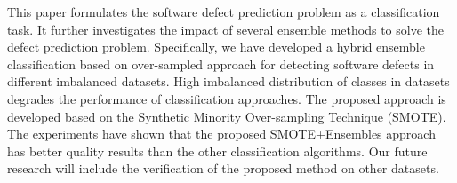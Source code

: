\documentclass[runningheads,a4paper]{llncs}
\begin{document}
This paper formulates the software defect prediction problem as a classification task. It further investigates the impact of several
ensemble methods to solve the defect prediction problem. Specifically, we have developed a hybrid ensemble classification based on over-sampled approach for detecting software defects in different imbalanced datasets. High imbalanced distribution of classes in datasets degrades the performance of classification approaches. The proposed approach is developed based on the Synthetic Minority Over-sampling Technique (SMOTE). The experiments have shown that the proposed SMOTE+Ensembles approach has better quality results than the other classification algorithms. Our future research will include the verification of the proposed method on other datasets.








\end{document}
